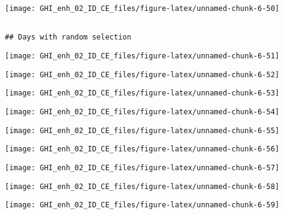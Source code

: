 \documentclass[
  10pt,
  a4paper,oneside]{article}
\begin{document}
\begin{center}\texttt{[image: GHI\_enh\_02\_ID\_CE\_files/figure-latex/unnamed-chunk-6-50]} \end{center}

\begin{verbatim}

## Days with random selection 
\end{verbatim}

\begin{center}\texttt{[image: GHI\_enh\_02\_ID\_CE\_files/figure-latex/unnamed-chunk-6-51]} \end{center}

\begin{center}\texttt{[image: GHI\_enh\_02\_ID\_CE\_files/figure-latex/unnamed-chunk-6-52]} \end{center}

\begin{center}\texttt{[image: GHI\_enh\_02\_ID\_CE\_files/figure-latex/unnamed-chunk-6-53]} \end{center}

\begin{center}\texttt{[image: GHI\_enh\_02\_ID\_CE\_files/figure-latex/unnamed-chunk-6-54]} \end{center}

\begin{center}\texttt{[image: GHI\_enh\_02\_ID\_CE\_files/figure-latex/unnamed-chunk-6-55]} \end{center}

\begin{center}\texttt{[image: GHI\_enh\_02\_ID\_CE\_files/figure-latex/unnamed-chunk-6-56]} \end{center}

\begin{center}\texttt{[image: GHI\_enh\_02\_ID\_CE\_files/figure-latex/unnamed-chunk-6-57]} \end{center}

\begin{center}\texttt{[image: GHI\_enh\_02\_ID\_CE\_files/figure-latex/unnamed-chunk-6-58]} \end{center}

\begin{center}\texttt{[image: GHI\_enh\_02\_ID\_CE\_files/figure-latex/unnamed-chunk-6-59]} \end{center}
\end{document}
